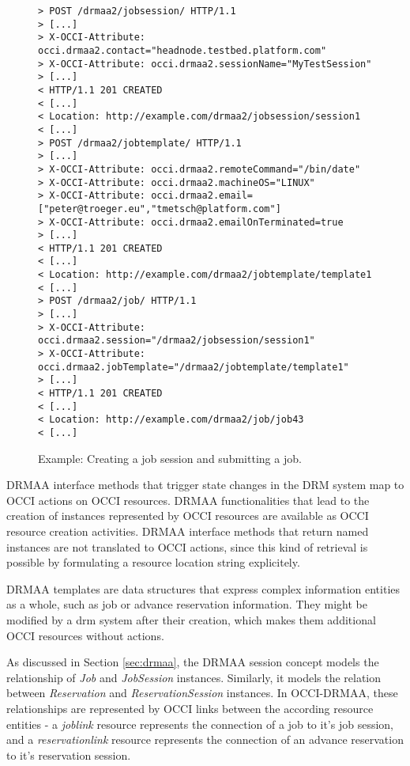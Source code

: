 \documentclass[twocolumn]{svjour3}       %
\begin{document}
\begin{figure*}
\center
\begin{lstlisting}
> POST /drmaa2/jobsession/ HTTP/1.1
> [...]
> X-OCCI-Attribute: occi.drmaa2.contact="headnode.testbed.platform.com"
> X-OCCI-Attribute: occi.drmaa2.sessionName="MyTestSession"
> [...]
< HTTP/1.1 201 CREATED 
< [...] 
< Location: http://example.com/drmaa2/jobsession/session1
< [...]
> POST /drmaa2/jobtemplate/ HTTP/1.1
> [...]
> X-OCCI-Attribute: occi.drmaa2.remoteCommand="/bin/date"
> X-OCCI-Attribute: occi.drmaa2.machineOS="LINUX"
> X-OCCI-Attribute: occi.drmaa2.email=["peter@troeger.eu","tmetsch@platform.com"]
> X-OCCI-Attribute: occi.drmaa2.emailOnTerminated=true
> [...]
< HTTP/1.1 201 CREATED 
< [...] 
< Location: http://example.com/drmaa2/jobtemplate/template1
< [...]
> POST /drmaa2/job/ HTTP/1.1
> [...]
> X-OCCI-Attribute: occi.drmaa2.session="/drmaa2/jobsession/session1"
> X-OCCI-Attribute: occi.drmaa2.jobTemplate="/drmaa2/jobtemplate/template1"
> [...]
< HTTP/1.1 201 CREATED 
< [...] 
< Location: http://example.com/drmaa2/job/job43
< [...]
\end{lstlisting}
\caption{Example: Creating a job session and submitting a job.}
\label{fig:createjob} 
\end{figure*}

DRMAA interface methods that trigger state changes in the DRM system map to OCCI actions on OCCI resources. DRMAA functionalities that lead to the creation of instances represented by OCCI resources are available as OCCI resource creation activities. DRMAA interface methods that return named instances are not translated to OCCI actions, since this kind of retrieval is possible by formulating a resource location string explicitely. 

DRMAA templates are data structures that express complex information entities as a whole, such as job or advance reservation information. They might be modified by a \gls{drm} system after their creation, which makes them additional OCCI resources without actions.

As discussed in Section \ref{sec:drmaa}, the DRMAA session concept models the relationship of \emph{Job} and \emph{JobSession} instances. Similarly, it models the relation between \emph{Reservation} and \emph{ReservationSession} instances. In OCCI-DRMAA, these relationships are represented by OCCI links between the according resource entities -  a \emph{joblink} resource represents the connection of a job to it's job session, and a \emph{reservationlink} resource represents the connection of an advance reservation to it's reservation session.
\end{document}
